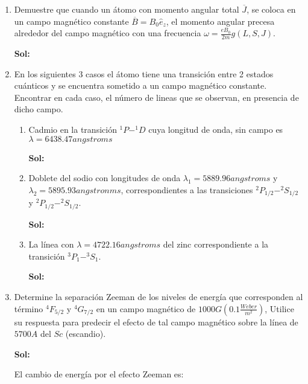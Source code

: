 \documentclass[12pt,a4paper]{article}
\begin{document}
\begin{enumerate}



\item Demuestre que cuando un átomo con momento angular total $\overline{J}$, se coloca en un campo magnético constante $\overline{B}=B_0 \hat{e}_z$, el momento angular precesa alrededor del campo magnético con una frecuencia $\omega = \frac{eB_0}{2m}g(L,S,J)$.

\textbf{Sol:}








\item En los siguientes 3 casos el átomo tiene una transición entre 2 estados cuánticos y se encuentra sometido a un campo magnético constante. Encontrar en cada caso, el número de lineas que se observan, en presencia de dicho campo.

\begin{enumerate}
    \item Cadmio en la transición $^{1}P-^{1}D$ cuya longitud de onda, sin campo es $\lambda=6438.47 angstroms$
    
    \textbf{Sol:}
    
    \item Doblete del sodio con longitudes de onda $\lambda_1=5889.96 angstroms$ y $\lambda_2 =5895.93 angstronms$, correspondientes a las transiciones $^{2}P_{1/2}-^{2}S_{1/2}$ y $^{2}P_{1/2}-^{2}S_{1/2}$.
    
    \textbf{Sol:}
    
    \item La línea con $\lambda=4722.16 angstroms$ del zinc correspondiente a la transición $^{3}P_1 - ^{3}S_1$.
    
    \textbf{Sol:}

\end{enumerate}








\item Determine la separación Zeeman de los niveles de energía que corresponden al término $^{4}F_{5/2}$ y $^{4}G_{7/2}$ en un campo magnético de $1000G(0.1\frac{Weber}{m^2})$, Utilice su respuesta para predecir el efecto de tal campo magnético sobre la línea de $5700 A$ del $Sc$ (escandio).

\textbf{Sol:}

El cambio de energía por el efecto Zeeman es:


\end{enumerate}
\end{document}
